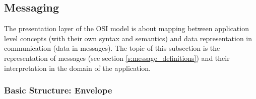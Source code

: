 \documentclass{article}
\begin{document}

  \subsection{Messaging}

   The presentation layer of the OSI model is about mapping between application
   level concepts (with their own syntax and semantics) and data representation
   in communication (data in messages). The topic of this subsection is the
   representation of messages (see section \ref{s:message_definitions}) and
   their interpretation in the domain of the application.
   


   \subsubsection{Basic Structure: Envelope} \label{ss:structure}
\end{document}

